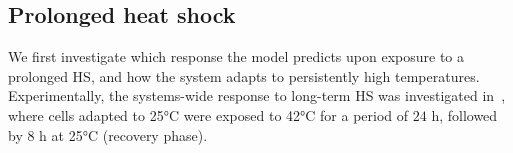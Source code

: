 \documentclass[oneside, 10pt, a4paper, twocolumn]{article}
\begin{document}
\subsection{Prolonged heat shock}
\label{SecAcclimation}

We first investigate which response the model predicts upon exposure to a prolonged HS, and how
the system adapts to persistently high temperatures.
Experimentally, the systems-wide response to long-term HS was investigated in~\cite{Hemme2014},
where cells adapted to 25°C were exposed to 42°C for a period of $24$ h, followed by $8$ h at 25°C (recovery phase).

\end{document}
